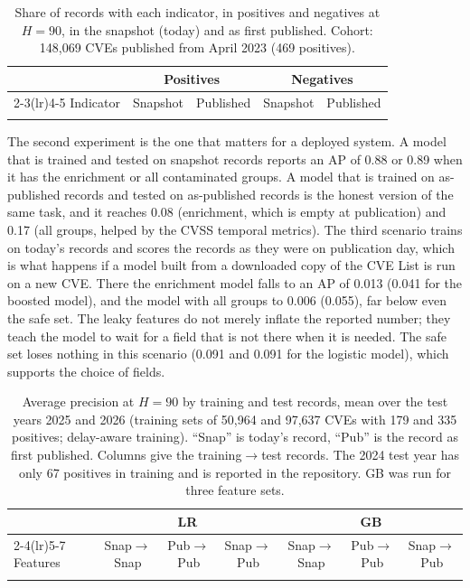 \documentclass[conference,a4paper]{IEEEtran}
\begin{document}
\begin{table}[t]
\centering
\caption{Share of records with each indicator, in positives and negatives at $H=90$, in the snapshot (today) and as first published. Cohort: 148{,}069 CVEs published from April 2023 (469 positives).}
\label{tab:histind}
\small
\begin{tabular}{lrrrr}
\toprule
 & \multicolumn{2}{c}{Positives} & \multicolumn{2}{c}{Negatives}\\
\cmidrule(lr){2-3}\cmidrule(lr){4-5}
Indicator & Snapshot & Published & Snapshot & Published \\
\midrule
\\
\bottomrule
\end{tabular}
\end{table}

The second experiment is the one that matters for a deployed system. A model that is trained and tested on snapshot records reports an AP of 0.88 or 0.89 when it has the enrichment or all contaminated groups. A model that is trained on as-published records and tested on as-published records is the honest version of the same task, and it reaches 0.08 (enrichment, which is empty at publication) and 0.17 (all groups, helped by the CVSS temporal metrics). The third scenario trains on today's records and scores the records as they were on publication day, which is what happens if a model built from a downloaded copy of the CVE List is run on a new CVE. There the enrichment model falls to an AP of 0.013 (0.041 for the boosted model), and the model with all groups to 0.006 (0.055), far below even the safe set. The leaky features do not merely inflate the reported number; they teach the model to wait for a field that is not there when it is needed. The safe set loses nothing in this scenario (0.091 and 0.091 for the logistic model), which supports the choice of fields.

\begin{table}[t]
\centering
\caption{Average precision at $H=90$ by training and test records, mean over the test years 2025 and 2026 (training sets of 50{,}964 and 97{,}637 CVEs with 179 and 335 positives; delay-aware training). ``Snap'' is today's record, ``Pub'' is the record as first published. Columns give the training$\to$test records. The 2024 test year has only 67 positives in training and is reported in the repository. GB was run for three feature sets.}
\label{tab:hist}
\small
\begin{tabular}{lcccccc}
\toprule
 & \multicolumn{3}{c}{LR} & \multicolumn{3}{c}{GB}\\
\cmidrule(lr){2-4}\cmidrule(lr){5-7}
Features & Snap$\to$Snap & Pub$\to$Pub & Snap$\to$Pub & Snap$\to$Snap & Pub$\to$Pub & Snap$\to$Pub \\
\midrule
\\
\bottomrule
\end{tabular}
\end{table}
\end{document}
